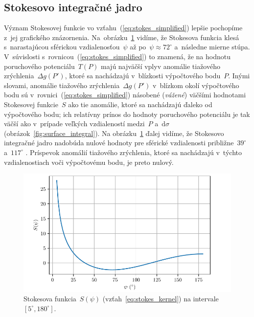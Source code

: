\documentclass[a4paper, 12pt]{book}
\newcommand{\diff}{\mathrm d}
\begin{document}
\subsection{Stokesovo integračné jadro}
\label{sec:stokes_kernel}

Význam Stokesovej funkcie vo vzťahu~(\ref{eq:stokes_simplified}) lepšie 
pochopíme z~jej grafického znázornenia.  Na~obrázku~\ref{fig:stokes_kernel} 
vidíme, že Stokesova funkcia klesá s~narastajúcou sférickou 
vzdialenosťou~$\psi$ až po~$\psi \approx 72^\circ$ a~následne mierne stúpa.  
V~súvislosti s~rovnicou~(\ref{eq:stokes_simplified}) to znamená, že na hodnotu 
poruchového potenciálu~$T(P)$ majú najväčší vplyv anomálie tiažového 
zrýchlenia~$\Delta g(P')$, ktoré sa nachádzajú v~blízkosti výpočtového 
bodu~$P$.  Inými slovami, anomálie tiažového zrýchlenia~$\Delta g(P')$ 
v~blízkom okolí výpočtového bodu sú v~rovnici~(\ref{eq:stokes_simplified}) 
násobené (\emph{vážené}) väčšími hodnotami Stokesovej funkcie~$S$ ako tie 
anomálie, ktoré sa nachádzajú ďaleko od výpočtového bodu; ich relatívny prínos 
do hodnoty poruchového potenciálu je tak väčší ako v~prípade veľkých 
vzdialeností medzi~$P$ a~$\diff\sigma$ (obrázok~\ref{fig:surface_integral}).  
Na obrázku~\ref{fig:stokes_kernel} ďalej vidíme, že Stokesovo integračné jadro 
nadobúda nulové hodnoty pre sférické vzdialenosti približne~$39^\circ$ 
a~$117^\circ$ \parencite{TorgeGeodesy}.  Príspevok anomálií tiažového 
zrýchlenia, ktoré sa nachádzajú v~týchto vzdialenostiach voči výpočtovému bodu, 
je preto nulový.

\begin{figure}[bt]
\centering
\includegraphics{./fig-stokes-kernel.pdf}
\caption{Stokesova funkcia~$S(\psi)$ (vzťah~\ref{eq:stokes_kernel}) na 
intervale~$[5^\circ, 180^\circ]$.}
\label{fig:stokes_kernel}
\end{figure}
\end{document}
